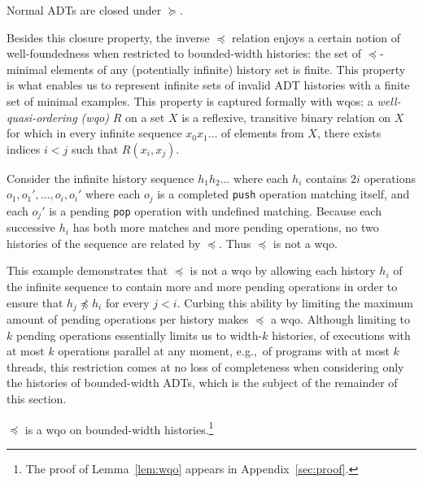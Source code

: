 \begin{lemma}
  \label{lem:ADT_closure}

  Normal ADTs are closed under $\succeq$.

\end{lemma}

Besides this closure property, the inverse $\preceq$ relation enjoys a certain notion of
well-foundedness when restricted to bounded-width histories: the set of
$\preceq$-minimal elements of any (potentially infinite) history set is finite.
This property is what enables us to represent infinite sets of invalid ADT
histories with a finite set of minimal examples. This property is captured
formally with wqos: a \emph{well-quasi-ordering (wqo)} $R$ on a set $X$ is a
reflexive, transitive binary relation on $X$ for which in every infinite
sequence $x_0 x_1 \ldots$ of elements from $X$, there exists indices $i < j$
such that $R(x_i,x_j)$.

\begin{example}

  Consider the infinite history sequence $h_1 h_2 \ldots$ where each $h_i$
  contains $2i$ operations $o_1, o_1', \ldots, o_i, o_i'$ where each $o_j$ is a
  completed {\tt push} operation matching itself, and each $o_j'$ is a pending
  {\tt pop} operation with undefined matching. Because each successive $h_i$
  has both more matches and more pending operations, no two histories of the
  sequence are related by $\preceq$. Thus $\preceq$ is not a wqo.

\end{example}

This example demonstrates that $\preceq$ is not a wqo by allowing each history
$h_i$ of the infinite sequence to contain more and more pending operations in
order to ensure that $h_j \not\preceq h_i$ for every $j < i$. Curbing this
ability by limiting the maximum amount of pending operations per history makes
$\preceq$ a wqo. Although limiting to $k$ pending operations essentially limits
us to width-$k$ histories, of executions with at most $k$ operations parallel at
any moment, e.g.,~of programs with at most $k$ threads, this restriction comes
at no loss of completeness when considering only the histories of bounded-width
ADTs, which is the subject of the remainder of this section.

\begin{lemma}
  \label{lem:wqo}

  $\preceq$ is a wqo on bounded-width histories.\footnote{The proof of
  Lemma~\ref{lem:wqo} appears in Appendix~\ref{sec:proof}.}

\end{lemma}

